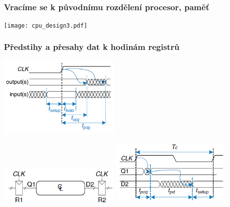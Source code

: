 \documentclass{beamer}
\begin{document}
\begin{frame}
\frametitle{Vracíme se k původnímu rozdělení procesor, paměť}
\texttt{[image: cpu\_design3.pdf]}
\end{frame}

\begin{frame}
\frametitle{Předstihy a přesahy dat k hodinám registrů}
\includegraphics[width=0.45\textwidth]{fig/timing_clk.png}

\includegraphics[width=0.45\textwidth]{fig/timing_clk3.png}
\hfill 
\includegraphics[width=0.45\textwidth]{fig/timing_clk2.png}

\end{frame}
\end{document}
